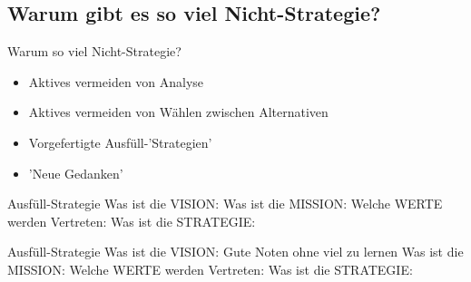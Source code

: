 \subsection{Warum gibt es so viel Nicht-Strategie?}

\begin{frame}[c]{Warum so viel Nicht-Strategie?}
    \Large
    \begin{itemize}
        \item Aktives vermeiden von Analyse \pause
        \item Aktives vermeiden von Wählen zwischen Alternativen \pause
        \item Vorgefertigte Ausfüll-'Strategien' \pause
        \item 'Neue Gedanken'
    \end{itemize}
\end{frame}


\begin{frame}[c]{Ausfüll-Strategie}
    Was ist die VISION:
    \newline
    \newline
    \newline
    Was ist die MISSION:
    \newline
    \newline
    \newline
    Welche WERTE werden Vertreten:
    \newline
    \newline
    \newline
    Was ist die STRATEGIE:
    \newline
    \newline
\end{frame}


\begin{frame}[c]{Ausfüll-Strategie}
    Was ist die VISION:
    \newline
    Gute Noten ohne viel zu lernen
    \newline
    \newline
    Was ist die MISSION:
    \newline
    \newline
    \newline
    Welche WERTE werden Vertreten:
    \newline
    \newline
    \newline
    Was ist die STRATEGIE:
    \newline
    \newline
\end{frame}


